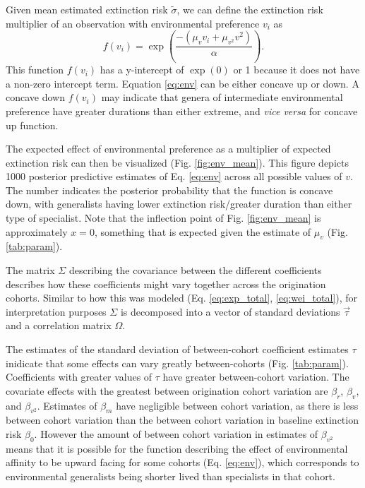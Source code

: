 \documentclass{article}
\begin{document}
Given mean estimated extinction risk \(\tilde{\sigma}\), we can define the extinction risk multiplier of an observation with environmental preference \(v_{i}\) as 
\begin{equation}
  f(v_{i}) = \exp\left(\frac{-(\mu_{v} v_{i} + \mu_{v^{2}} v^{2})}{\alpha}\right).
  \label{eq:env}
\end{equation}
This function \(f(v_{i})\) has a y-intercept of \(\exp(0)\) or 1 because it does not have a non-zero intercept term. Equation \ref{eq:env} can be either concave up or down. A concave down \(f(v_{i})\) may indicate that genera of intermediate environmental preference have greater durations than either extreme, and \textit{vice versa} for concave up function.

The expected effect of environmental preference as a multiplier of expected extinction risk can then be visualized (Fig. \ref{fig:env_mean}). This figure depicts 1000 posterior predictive estimates of Eq. \ref{eq:env} across all possible values of \(v\). The number indicates the posterior probability that the function is concave down, with generalists having lower extinction risk/greater duration than either type of specialist. Note that the inflection point of Fig. \ref{fig:env_mean} is approximately \(x = 0\), something that is expected given the estimate of \(\mu_{v}\) (Fig. \ref{tab:param}).

The matrix \(\Sigma\) describing the covariance between the different coefficients describes how these coefficients might vary together across the origination cohorts. Similar to how this was modeled (Eq. \ref{eq:exp_total}, \ref{eq:wei_total}), for interpretation purposes \(\Sigma\) is decomposed into a vector of standard deviations \(\vec{\tau}\) and a correlation matrix \(\Omega\).

The estimates of the standard deviation of between-cohort coefficient estimates \(\tau\) inidicate that some effects can vary greatly between-cohorts (Fig. \ref{tab:param}). Coefficients with greater values of \(\tau\) have greater between-cohort variation. The covariate effects with the greatest between origination cohort variation are \(\beta_{r}\), \(\beta_{v}\), and \(\beta_{v^{2}}\). Estimates of \(\beta_{m}\) have negligible between cohort variation, as there is less between cohort variation than the between cohort variation in baseline extinction risk \(\beta_{0}\). However the amount of between cohort variation in estimates of \(\beta_{v^{2}}\) means that it is possible for the function describing the effect of environmental affinity to be upward facing for some cohorts (Eq. \ref{eq:env}), which corresponds to environmental generalists being shorter lived than specialists in that cohort.
\end{document}

